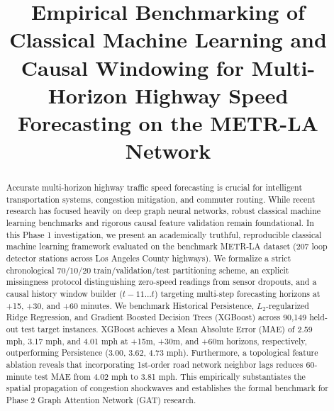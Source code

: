 \documentclass[conference]{IEEEtran}
\begin{document}
\title{Empirical Benchmarking of Classical Machine Learning and Causal Windowing for Multi-Horizon Highway Speed Forecasting on the METR-LA Network}

\author{
\and
{}
\and
{}
\and
{}
}

\maketitle

\begin{abstract}
Accurate multi-horizon highway traffic speed forecasting is crucial for intelligent transportation systems, congestion mitigation, and commuter routing. While recent research has focused heavily on deep graph neural networks, robust classical machine learning benchmarks and rigorous causal feature validation remain foundational. In this Phase 1 investigation, we present an academically truthful, reproducible classical machine learning framework evaluated on the benchmark METR-LA dataset (207 loop detector stations across Los Angeles County highways). We formalize a strict chronological 70/10/20 train/validation/test partitioning scheme, an explicit missingness protocol distinguishing zero-speed readings from sensor dropouts, and a causal history window builder ($t-11 \dots t$) targeting multi-step forecasting horizons at +15, +30, and +60 minutes. We benchmark Historical Persistence, $L_2$-regularized Ridge Regression, and Gradient Boosted Decision Trees (XGBoost) across 90,149 held-out test target instances. XGBoost achieves a Mean Absolute Error (MAE) of 2.59 mph, 3.17 mph, and 4.01 mph at +15m, +30m, and +60m horizons, respectively, outperforming Persistence (3.00, 3.62, 4.73 mph). Furthermore, a topological feature ablation reveals that incorporating 1st-order road network neighbor lags reduces 60-minute test MAE from 4.02 mph to 3.81 mph. This empirically substantiates the spatial propagation of congestion shockwaves and establishes the formal benchmark for Phase 2 Graph Attention Network (GAT) research.
\end{abstract}
\end{document}
